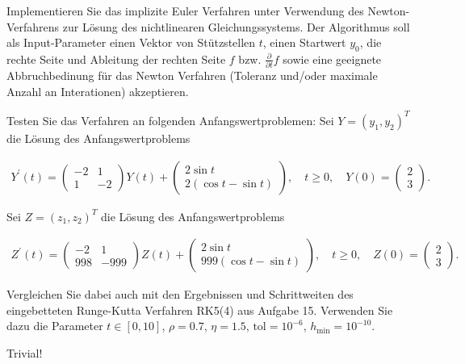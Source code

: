 \begin{exercise}

Implementieren Sie das implizite Euler Verfahren unter Verwendung des Newton-Verfahrens zur Lösung des nichtlinearen Gleichungssystems. Der Algorithmus soll als Input-Parameter einen Vektor von Stützstellen $t$, einen Startwert $y_0$, die rechte Seite und Ableitung der rechten Seite $f$ bzw. $\frac{\partial}{\partial t} f$ sowie eine geeignete Abbruchbedinung für das Newton Verfahren (Toleranz und/oder maximale Anzahl an Interationen) akzeptieren.

Testen Sie das Verfahren an folgenden Anfangswertproblemen: Sei $Y = (y_1, y_2)^T$ die Lösung des Anfangswertproblems

\begin{align} \tag{1}
    Y^\prime(t)
    =
    \begin{pmatrix}
        -2 &  1 \\
         1 & -2
    \end{pmatrix}
    Y(t)
    +
    \begin{pmatrix}
        2 \sin{t} \\
        2 (\cos{t} - \sin{t})
    \end{pmatrix},
    \quad
    t \geq 0,
    \quad
    Y(0)
    =
    \begin{pmatrix}
        2 \\
        3
    \end{pmatrix}.
\end{align}

Sei $Z = (z_1, z_2)^T$ die Lösung des Anfangswertproblems

\begin{align} \tag{2}
    Z^\prime(t)
    =
    \begin{pmatrix}
        -2   &  1 \\
         998 & -999
    \end{pmatrix}
    Z(t)
    +
    \begin{pmatrix}
        2 \sin{t} \\
        999 (\cos{t} - \sin{t})
    \end{pmatrix},
    \quad
    t \geq 0,
    \quad
    Z(0)
    =
    \begin{pmatrix}
        2 \\
        3
    \end{pmatrix}.
\end{align}

Vergleichen Sie dabei auch mit den Ergebnissen und Schrittweiten des eingebetteten Runge-Kutta Verfahren RK5(4) aus Aufgabe 15. Verwenden Sie dazu die Parameter $t \in [0, 10]$, $\rho = 0.7$, $\eta = 1.5$, $\text{tol} = 10^{-6}$, $h_{\text{min}} = 10^{-10}$.

\end{exercise}

\begin{solution}

Trivial!

\end{solution}
